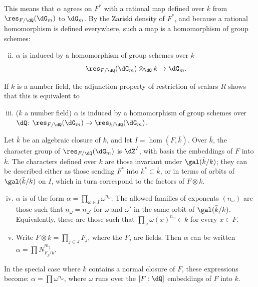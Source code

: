 This means that $\alpha$ agrees on $F^\ast$ with a rational map defined over $k$ 
from $\res_{F/\dQ}(\dG_m)$ to $\dG_m$. By the Zariski density of 
$F^\ast$, and because a rational homomorphism is defined everywhere, such 
a map is a homomorphism of group schemes: 
\begin{enumerate}[(i)]
\setcounter{enumi}{1}
  \item $\alpha$ is induced by a homomorphism of group schemes over $k$ 
    \[
      \res_{F/\dQ}(\dG_m)\otimes_\dQ k \to \dG_m \text{.} 
    \] 
\end{enumerate}

If $k$ is a number field, the adjunction property of restriction of 
scalars $R$ shows that this is equivalent to 
\begin{enumerate}[(i)]
\setcounter{enumi}{2}
  \item ($k$ a number field) $\alpha$ is induced by a homomorphism of 
    group schemes over $\dQ$: $\res_{F/\dQ}(\dG_m) \to \res_{k/\dQ}(\dG_m)$. 
\end{enumerate}

Let $\bar k$ be an algebraic closure of $k$, and let $I=\hom(F,\bar k)$. Over 
$\bar k$, the character group of $\res_{F/\dQ}(\dG_m)$ is $\dZ^I$, with basis 
the embeddings of $F$ into $\bar k$. The characters defined over $k$ 
are those invariant under $\gal(\bar k/k)$; they can be described either as 
those sending $F^\ast$ into $k^\ast\subset \bar k$, or in terms of 
orbits of $\gal(\bar k/k)$ on $I$, which in turn correspond to the factors of 
$F\otimes k$. 
\begin{enumerate}[(i)]
\setcounter{enumi}{3}
  \item $\alpha$ is of the form 
    $\alpha=\prod_{\omega\in I} \omega^{n_\omega}$. The allowed families of exponents 
    $(n_\omega)$ are those such that $n_\omega=n_{\omega'}$ for 
    $\omega$ and $\omega'$ in the same orbit of $\gal(\bar k/k)$. Equivalently, these 
    are those such that $\prod_\omega \omega(x)^{n_\omega}\in k$ for every 
    $x\in F$. 
\item Write $F\otimes k=\prod_{j\in J} F_j$, where the $F_j$ are fields. 
    Then $\alpha$ can be written $\alpha=\prod N_{F_j/k}^{m_j}$. 
\end{enumerate}

In the special case where $k$ contains a normal closure of $F$, these 
expressions become: $\alpha=\prod \omega^{n_\omega}$, where $\omega$ 
runs over the $[F:\dQ]$ embeddings of $F$ into $k$. 





